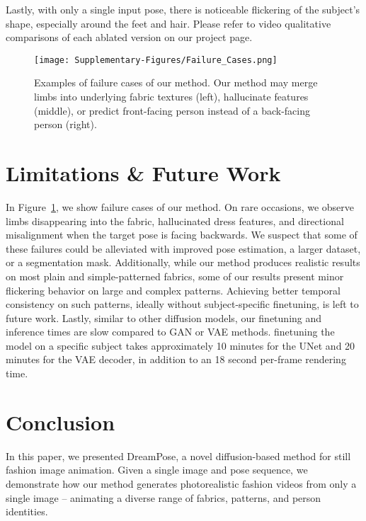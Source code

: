     Lastly, with only a single input pose, there is noticeable flickering of the subject's shape, especially around the feet and hair. Please refer to video qualitative comparisons of each ablated version on our project page.
        \begin{figure}%
            \begin{center}
                \texttt{[image: Supplementary-Figures/Failure\_Cases.png]}
            \end{center}
           \caption{Examples of failure cases of our method. Our method may merge limbs into underlying fabric textures (left), hallucinate features (middle), or predict front-facing person instead of a back-facing person (right).}
        \label{fig:failure-cases}
        \end{figure}    
\section{Limitations \& Future Work}  In Figure~\ref{fig:failure-cases}, we show failure cases of our method. On rare occasions, we observe limbs disappearing into the fabric, hallucinated dress features, and directional misalignment when the target pose is facing backwards. We suspect that some of these failures could be alleviated with improved pose estimation, a larger dataset, or a segmentation mask. Additionally, while our method produces realistic results on most plain and simple-patterned fabrics, some of our results present minor flickering behavior on large and complex patterns. Achieving better temporal consistency on such patterns, ideally without subject-specific finetuning, is left to future work. Lastly, similar to other diffusion models, our finetuning and inference times are slow compared to GAN or VAE methods. finetuning the model on a specific subject takes approximately 10 minutes for the UNet and 20 minutes for the VAE decoder, in addition to an 18 second per-frame rendering time. %

\section{Conclusion}
    In this paper, we presented DreamPose, a novel diffusion-based method for still fashion image animation. Given a single image and pose sequence, we demonstrate how our method generates photorealistic fashion videos from only a single image -- animating a diverse range of fabrics, patterns, and person identities. %

